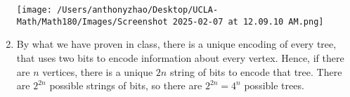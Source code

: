\documentclass[12pt]{article}
\begin{document}
\begin{enumerate}[start=1,label={\bfseries Problem \arabic*:},leftmargin=1in]
    \texttt{[image: /Users/anthonyzhao/Desktop/UCLA-Math/Math180/Images/Screenshot 2025-02-07 at 12.09.10 AM.png]}

    \item By what we have proven in class, there is a unique encoding of every tree, that uses two bits to encode information about every vertex. 
    Hence, if there are $n$ vertices, there is a unique $2n$ string of bits to encode that tree. There are $2^{2n}$ possible strings of bits, so there are $2^{2n} = 4^{n}$ possible trees.
\end{enumerate}
\end{document}

